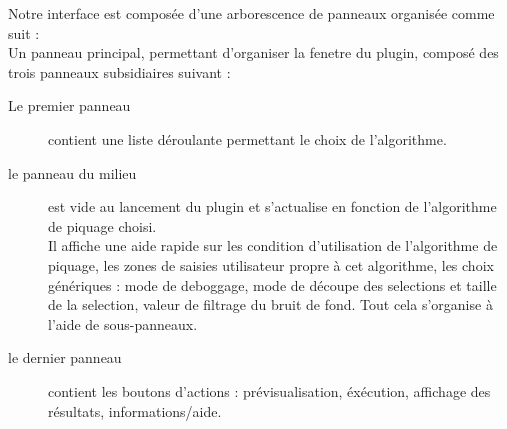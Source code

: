 Notre interface est composée d'une arborescence de panneaux organisée comme suit : \\
Un panneau principal, permettant d'organiser la fenetre du plugin, composé des trois panneaux subsidiaires suivant :
\begin{description}
\item [Le premier panneau] contient une liste déroulante permettant le choix de l'algorithme. 
\item [le panneau du milieu] est vide au lancement du plugin et s'actualise en fonction de l'algorithme de piquage choisi.\\
Il affiche une aide rapide sur les condition d'utilisation de l'algorithme de piquage, les zones de saisies utilisateur propre à cet algorithme, les choix génériques : mode de deboggage, mode de découpe des selections et taille de la selection, valeur de filtrage du bruit de fond. Tout cela s'organise à l'aide de sous-panneaux.
\item [le dernier panneau] contient les boutons d'actions : prévisualisation, éxécution, affichage des résultats, informations/aide.
\end{description}
